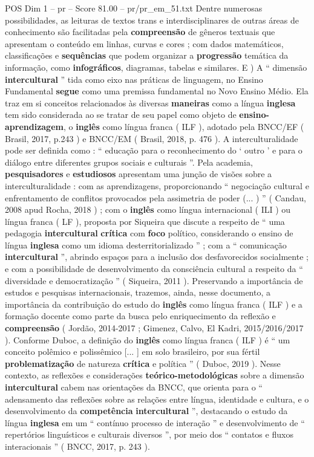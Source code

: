 \begin{textsample}{POS Dim 1 – pr – Score 81.00 – pr/pr\_em\_51.txt}
Dentre numerosas possibilidades, as leituras de textos trans e interdisciplinares de outras áreas de conhecimento são facilitadas pela \textbf{compreensão} de gêneros textuais que apresentam o conteúdo em linhas, curvas e cores ; com dados matemáticos, classificações e \textbf{sequências} que podem organizar a \textbf{progressão} temática da informação, como \textbf{infográficos}, diagramas, tabelas e similares.
E ) A “ dimensão \textbf{intercultural} ” tida como eixo nas práticas de linguagem, no Ensino Fundamental \textbf{segue} como uma premissa fundamental no Novo Ensino Médio.
Ela traz em si conceitos relacionados às diversas \textbf{maneiras} como a língua \textbf{inglesa} tem sido considerada ao se tratar de seu papel como objeto de \textbf{ensino-aprendizagem}, o \textbf{inglês} como língua franca ( ILF ), adotado pela BNCC/EF ( Brasil, 2017, p.243 ) e BNCC/EM ( Brasil, 2018, p. 476 ).
A interculturalidade pode ser definida como : “ educação para o reconhecimento do ‘ outro ’ e para o diálogo entre diferentes grupos sociais e culturais ”.
Pela academia, \textbf{pesquisadores} e \textbf{estudiosos} apresentam uma junção de visões sobre a interculturalidade : com as aprendizagens, proporcionando “ negociação cultural e enfrentamento de conflitos provocados pela assimetria de poder (... ) ” ( Candau, 2008 apud Rocha, 2018 ) ; com o \textbf{inglês} como língua internacional ( ILI ) ou língua franca ( LF ), proposta por Siqueira que discute a respeito de “ uma pedagogia \textbf{intercultural} \textbf{crítica} com \textbf{foco} político, considerando o ensino de língua \textbf{inglesa} como um idioma desterritorializado ” ; com a “ comunicação \textbf{intercultural} ”, abrindo espaços para a inclusão dos desfavorecidos socialmente ; e com a possibilidade de desenvolvimento da consciência cultural a respeito da “ diversidade e democratização ” ( Siqueira, 2011 ).
Preservando a importância de estudos e pesquisas internacionais, trazemos, ainda, nesse documento, a importância da contribuição do estudo do \textbf{inglês} como língua franca ( ILF ) e a formação docente como parte da busca pelo enriquecimento da reflexão e \textbf{compreensão} ( Jordão, 2014-2017 ; Gimenez, Calvo, El Kadri, 2015/2016/2017 ).
Conforme Duboc, a definição do \textbf{inglês} como língua franca ( ILF ) é “ um conceito polêmico e polissêmico [... ] em solo brasileiro, por sua fértil \textbf{problematização} de natureza \textbf{crítica} e política ” ( Duboc, 2019 ).
Nesse contexto, as reflexões e considerações \textbf{teórico-metodológicas} sobre a dimensão \textbf{intercultural} cabem nas orientações da BNCC, que orienta para o “ adensamento das reflexões sobre as relações entre língua, identidade e cultura, e o desenvolvimento da \textbf{competência} \textbf{intercultural} ”, destacando o estudo da língua \textbf{inglesa} em um “ contínuo processo de interação ” e desenvolvimento de “ repertórios linguísticos e culturais diversos ”, por meio dos “ contatos e fluxos interacionais ” ( BNCC, 2017, p. 243 ).

\end{textsample}
